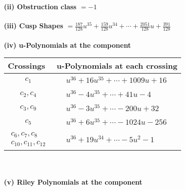 \documentclass[1p]{elsarticle_modified}
\theoremstyle{definition}
\begin{document}
\flushleft \textbf{(ii) Obstruction class $= -1$}\\~\\
\flushleft \textbf{(iii) Cusp Shapes $= \frac{187}{128} u^{35}+\frac{159}{128} u^{34}+\cdots+\frac{2051}{128} u+\frac{391}{128}$}\\~\\
\newpage\renewcommand{\arraystretch}{1}
\flushleft \textbf{(iv) u-Polynomials at the component}\newline \\
\begin{tabular}{m{50pt}|m{274pt}}
Crossings & \hspace{64pt}u-Polynomials at each crossing \\
\hline $$\begin{aligned}c_{1}\end{aligned}$$&$\begin{aligned}
&u^{36}+16 u^{35}+\cdots+1009 u+16
\end{aligned}$\\
\hline $$\begin{aligned}c_{2},c_{4}\end{aligned}$$&$\begin{aligned}
&u^{36}-4 u^{35}+\cdots+41 u-4
\end{aligned}$\\
\hline $$\begin{aligned}c_{3},c_{9}\end{aligned}$$&$\begin{aligned}
&u^{36}-3 u^{35}+\cdots-200 u+32
\end{aligned}$\\
\hline $$\begin{aligned}c_{5}\end{aligned}$$&$\begin{aligned}
&u^{36}+6 u^{35}+\cdots-1024 u-256
\end{aligned}$\\
\hline $$\begin{aligned}c_{6},c_{7},c_{8}\\c_{10},c_{11},c_{12}\end{aligned}$$&$\begin{aligned}
&u^{36}+19 u^{34}+\cdots-5 u^2-1
\end{aligned}$\\
\hline
\end{tabular}\\~\\
\newpage\renewcommand{\arraystretch}{1}
\flushleft \textbf{(v) Riley Polynomials at the component}\newline \\
\end{document}
